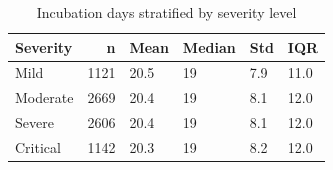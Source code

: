 \begin{table}[htbp]
\caption{Incubation days stratified by severity level}
\label{tab:incubation_severity}
\begin{tabular}{lrllll}
\toprule
Severity & n & Mean & Median & Std & IQR \\
\midrule
Mild & 1121 & 20.5 & 19 & 7.9 & 11.0 \\
Moderate & 2669 & 20.4 & 19 & 8.1 & 12.0 \\
Severe & 2606 & 20.4 & 19 & 8.1 & 12.0 \\
Critical & 1142 & 20.3 & 19 & 8.2 & 12.0 \\
\bottomrule
\end{tabular}
\end{table}
